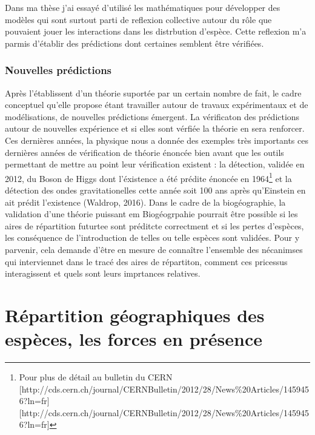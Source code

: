 Dans ma thèse j'ai essayé d'utilisé les mathématiques pour développer
des modèles qui sont surtout parti de reflexion collective autour du
rôle que pouvaient jouer les interactions dans les distrbution d'espèce.
Cette reflexion m'a parmis d'établir des prédictions dont certaines
semblent être vérifiées.

\subsubsection*{Nouvelles prédictions}\label{nouvelles-pruxe9dictions}

Après l'établissent d'un théorie suportée par un certain nombre de fait,
le cadre conceptuel qu'elle propose étant travailler autour de travaux
expérimentaux et de modélisations, de nouvelles prédictions émergent. La
vérificaton des prédictions autour de nouvelles expérience et si elles
sont vérfiée la théorie en sera renforcer. Ces dernières années, la
physique nous a donnée des exemples très importants ces dernières années
de vérification de théorie énoncée bien avant que les outils permettant
de mettre au point leur vérification existent : la détection, validée en
2012, du Boson de Higgs dont l'éxistence a été prédite énoncée en
1964\footnote{Pour plus de détail au bulletin du CERN
  {[}http://cds.cern.ch/journal/CERNBulletin/2012/28/News\%20Articles/1459456?ln=fr{]}{[}http://cds.cern.ch/journal/CERNBulletin/2012/28/News\%20Articles/1459456?ln=fr{]}}
et la détection des ondes gravitationelles cette année soit 100 ans
après qu'Einstein en ait prédit l'existence (Waldrop, 2016). Dans le
cadre de la biogéographie, la validation d'une théorie puissant em
Biogéogrpahie pourrait être possible si les aires de répartition
futurtee sont préditcte correctment et si les pertes d'espèces, les
conséquence de l'introduction de telles ou telle espèces sont validées.
Pour y parvenir, cela demande d'être en mesure de connaître l'ensemble
des nécanimses qui interviennet dans le tracé des aires de répartiton,
comment ces pricessus interagissent et quels sont leurs imprtances
relatives.

\section*{Répartition géographiques des espèces, les forces en
présence}\label{ruxe9partition-guxe9ographiques-des-espuxe8ces-les-forces-en-pruxe9sence}

